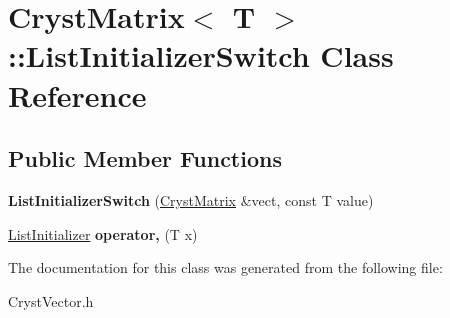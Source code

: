 \hypertarget{class_cryst_matrix_1_1_list_initializer_switch}{}\section{Cryst\+Matrix$<$ T $>$\+::List\+Initializer\+Switch Class Reference}
\label{class_cryst_matrix_1_1_list_initializer_switch}
\subsection*{Public Member Functions}
\begin{DoxyCompactItemize}
\item 
\mbox{\label{class_cryst_matrix_1_1_list_initializer_switch_afb00845c9f110277415895675fbb3a93}} 
{\bfseries List\+Initializer\+Switch} (\mbox{\hyperlink{class_cryst_matrix}{Cryst\+Matrix}} \&vect, const T value)
\item 
\mbox{\label{class_cryst_matrix_1_1_list_initializer_switch_ab94b0e920d481b88d828ee702f35c52c}} 
\mbox{\hyperlink{class_cryst_matrix_1_1_list_initializer}{List\+Initializer}} {\bfseries operator,} (T x)
\end{DoxyCompactItemize}


The documentation for this class was generated from the following file\+:\begin{DoxyCompactItemize}
\item 
Cryst\+Vector.\+h\end{DoxyCompactItemize}
